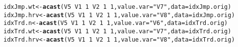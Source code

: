 \documentclass[a4paper,english,10pt]{article}\usepackage[]{graphicx}\usepackage[]{color}
\makeatletter
\newcommand{\hlnum}[1]{\textcolor[rgb]{0.686,0.059,0.569}{#1}}%
\newcommand{\hlstr}[1]{\textcolor[rgb]{0.192,0.494,0.8}{#1}}%
\newcommand{\hlopt}[1]{\textcolor[rgb]{0,0,0}{#1}}%
\newcommand{\hlstd}[1]{\textcolor[rgb]{0.345,0.345,0.345}{#1}}%
\newcommand{\hlkwb}[1]{\textcolor[rgb]{0.69,0.353,0.396}{#1}}%
\newcommand{\hlkwc}[1]{\textcolor[rgb]{0.333,0.667,0.333}{#1}}%
\newcommand{\hlkwd}[1]{\textcolor[rgb]{0.737,0.353,0.396}{\textbf{#1}}}%
\newenvironment{kframe}{%
 \def\at@end@of@kframe{}%
 \ifinner\ifhmode%
  \def\at@end@of@kframe{\end{minipage}}%
  \begin{minipage}{\columnwidth}%
 \fi\fi%
 \def\FrameCommand##1{\hskip\@totalleftmargin \hskip-\fboxsep
 \colorbox{shadecolor}{##1}\hskip-\fboxsep
     \hskip-\linewidth \hskip-\@totalleftmargin \hskip\columnwidth}%
 \MakeFramed {\advance\hsize-\width
   \@totalleftmargin\z@ \linewidth\hsize
   \@setminipage}}%
 {\par\unskip\endMakeFramed%
 \at@end@of@kframe}
\newenvironment{knitrout}{}{} %
\makeatother
\begin{document}
\begin{knitrout}
\begin{kframe}
\begin{alltt}
\hlstd{idxJmp.wt} \hlkwb{<-} \hlkwd{acast}\hlstd{(V5} \hlopt{~} \hlstd{V1} \hlopt{~} \hlnum{1} \hlopt{~} \hlstd{V2} \hlopt{~} \hlnum{1} \hlopt{~} \hlnum{1}\hlstd{,} \hlkwc{value.var} \hlstd{=} \hlstr{"V7"}\hlstd{,} \hlkwc{data} \hlstd{= idxJmp.orig)}
\hlstd{idxJmp.hrv} \hlkwb{<-} \hlkwd{acast}\hlstd{(V5} \hlopt{~} \hlstd{V1} \hlopt{~} \hlnum{1} \hlopt{~} \hlstd{V2} \hlopt{~} \hlnum{1} \hlopt{~} \hlnum{1}\hlstd{,} \hlkwc{value.var} \hlstd{=} \hlstr{"V8"}\hlstd{,} \hlkwc{data} \hlstd{= idxJmp.orig)}
\hlstd{idxTrd.n} \hlkwb{<-} \hlkwd{acast}\hlstd{(V5} \hlopt{~} \hlstd{V1} \hlopt{~} \hlnum{1} \hlopt{~} \hlstd{V2} \hlopt{~} \hlnum{1} \hlopt{~} \hlnum{1}\hlstd{,} \hlkwc{value.var} \hlstd{=} \hlstr{"V6"}\hlstd{,} \hlkwc{data} \hlstd{= idxTrd.orig)}
\hlstd{idxTrd.wt} \hlkwb{<-} \hlkwd{acast}\hlstd{(V5} \hlopt{~} \hlstd{V1} \hlopt{~} \hlnum{1} \hlopt{~} \hlstd{V2} \hlopt{~} \hlnum{1} \hlopt{~} \hlnum{1}\hlstd{,} \hlkwc{value.var} \hlstd{=} \hlstr{"V7"}\hlstd{,} \hlkwc{data} \hlstd{= idxTrd.orig)}
\hlstd{idxTrd.hrv} \hlkwb{<-} \hlkwd{acast}\hlstd{(V5} \hlopt{~} \hlstd{V1} \hlopt{~} \hlnum{1} \hlopt{~} \hlstd{V2} \hlopt{~} \hlnum{1} \hlopt{~} \hlnum{1}\hlstd{,} \hlkwc{value.var} \hlstd{=} \hlstr{"V8"}\hlstd{,} \hlkwc{data} \hlstd{= idxTrd.orig)}
\end{alltt}
\end{kframe}
\end{knitrout}
\end{document}
